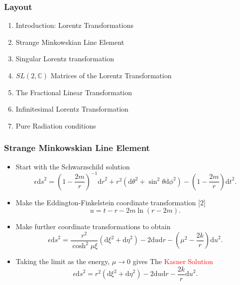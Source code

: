 \documentclass[10pt,a4paper]{beamer}
\begin{document}
\begin{frame}
\frametitle{Layout}
\begin{enumerate}
\item<1>{Introduction: Lorentz Transformations}
\item<1>{Strange Minkowskian Line Element}
\item<0>{Singular Lorentz transformation}
\item<0>{$SL(2,\mathbb{C})$ Matrices of the Lorentz Transformation}
\item<0>{The Fractional Linear Transformation}
\item<0>{Infinitesimal Lorentz Transformation}
\item<0>{Pure Radiation conditions}
\end{enumerate}
\end{frame}


\begin{frame}
\frametitle{Strange Minkowskian Line Element}
\begin{itemize}
\item<1->{Start with the Schwarzschild solution $$\epsilon {\mathrm{d}s}^2 = {\left(1 - \frac{2m}{r}\right)}^{-1} {\mathrm{d}r}^{2} + r^2 ({\mathrm{d}\theta}^2 + {{\sin}^2 \theta}{\mathrm{d} \phi}^2) - \left(1 - \frac{2m}{r}\right) {\mathrm{d}t}^2.$$}
\item<2->{Make the Eddington-Finkelstein coordinate transformation [2] $$u = t-r - 2m \ln(r-2m).$$}
\item<3->{Make further coordinate transformations to obtain $$\epsilon {\mathrm{d}s}^2 = \frac{r^2}{\cosh^{2}{\mu \xi}} ({\mathrm{d}\xi}^2 + {\mathrm{d}\eta}^2) - 2 {\mathrm{d}u}{\mathrm{d}r} - \left( \mu^{2} - \frac{2k}{r} \right) {\mathrm{d}u}^2.$$}
\item<4->{Taking the limit as the energy, $\mu \rightarrow 0$ gives The \textcolor{red}{Kasner Solution} $$\epsilon {\mathrm{d}s}^2 = r^2 ({\mathrm{d}\xi}^2 + {\mathrm{d}\eta}^2) - 2 {\mathrm{d}u}{\mathrm{d}r} - \frac{2k}{r} {\mathrm{d}u}^2.$$}
\end{itemize}
\end{frame}
\end{document}
